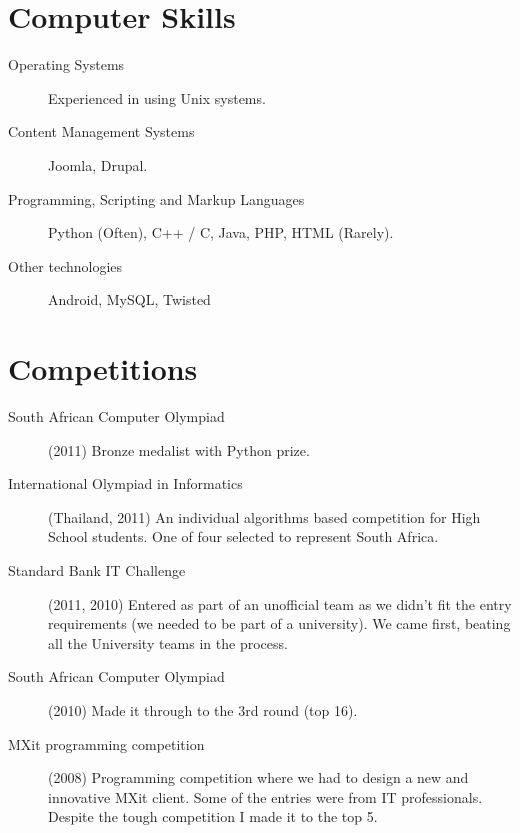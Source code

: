 \documentclass[margin,line,a4paper]{resume}
\begin{document}
\begin{resume}
\begin{description}
            \end{description}

        \section{\mysidestyle Computer Skills}
            \begin{description}
                \item [Operating Systems] Experienced in using Unix systems.

                \item [Content Management Systems] Joomla, Drupal.

                \item [Programming, Scripting and Markup Languages] Python (Often), C++ / C, Java, PHP, HTML (Rarely).

                \item [Other technologies] Android, MySQL, Twisted
            \end{description}

        \section{\mysidestyle Competitions}
            \begin{description}
                \item [South African Computer Olympiad] (2011) Bronze medalist with Python prize.

                \item [International Olympiad in Informatics] (Thailand, 2011) An individual 
                algorithms based competition for High School students. One of four selected
                to represent South Africa.

                \item [Standard Bank IT Challenge] (2011, 2010) Entered as part of an unofficial team
                as we didn't fit the entry requirements (we needed to be part of a university).
                We came first, beating all the University teams in the process.

                \item [South African Computer Olympiad] (2010) Made it through to the 3rd
                round (top 16).

                \item [MXit programming competition] (2008) Programming competition where we
                had to design a new and innovative MXit client.  Some of the
                entries were from IT professionals. Despite the tough competition I made it to the top 5.
            \end{description}


\end{resume}
\end{document}
